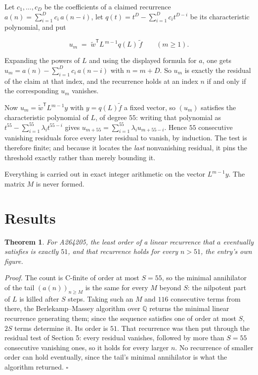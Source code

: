 \documentclass[11pt]{article}
\newtheorem{theorem}{Theorem}
\theoremstyle{definition}
\begin{document}
Let $c_1,\dots,c_D$ be the coefficients of a claimed recurrence $a(n) = \sum_{i=1}^{D} c_i\,a(n-i)$, let $q(t) = t^{D} - \sum_{i=1}^{D} c_i t^{D-i}$ be its characteristic polynomial, and put

\[u_m \;=\; \tilde w^{\mathsf T} L^{\,m-1} q(L)\,\tilde f \qquad (m \ge 1).\]

Expanding the powers of $L$ and using the displayed formula for $a$, one gets $u_m = a(n) - \sum_{i=1}^{D} c_i\,a(n-i)$ with $n = m + D$. So $u_m$ is exactly the residual of the claim at that index, and the recurrence holds at an index $n$ if and only if the corresponding $u_m$ vanishes.

Now $u_m = \tilde w^{\mathsf T} L^{m-1} y$ with $y = q(L)\tilde f$ a fixed vector, so $(u_m)$ satisfies the characteristic polynomial of $L$, of degree $55$: writing that polynomial as $t^{55} - \sum_{i=1}^{55} \lambda_i t^{55-i}$ gives $u_{m+55} = \sum_{i=1}^{55} \lambda_i u_{m+55-i}$. Hence $55$ consecutive vanishing residuals force every later residual to vanish, by induction. The test is therefore finite; and because it locates the {\itshape last} nonvanishing residual, it pins the threshold exactly rather than merely bounding it.

Everything is carried out in exact integer arithmetic on the vector $L^{m-1}y$. The matrix $M$ is never formed.

\section{Results}

\begin{theorem} For A264205, the least order of a linear recurrence that $a$ eventually satisfies is exactly $51$, and that recurrence holds for every $n > 51$, the entry's own figure.\end{theorem}

{\itshape Proof.} The count is C-finite of order at most $S = 55$, so the minimal annihilator of the tail $(a(n))_{n \ge M}$ is the same for every $M$ beyond $S$: the nilpotent part of $L$ is killed after $S$ steps. Taking such an $M$ and $116$ consecutive terms from there, the Berlekamp--Massey algorithm over $\mathbb{Q}$ returns the minimal linear recurrence generating them; since the sequence satisfies one of order at most $S$, $2S$ terms determine it. Its order is $51$. That recurrence was then put through the residual test of Section 5: every residual vanishes, followed by more than $S = 55$ consecutive vanishing ones, so it holds for every larger $n$. No recurrence of smaller order can hold eventually, since the tail's minimal annihilator is what the algorithm returned. $\square$
\end{document}
